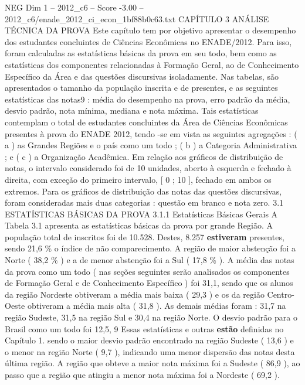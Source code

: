 \begin{textsample}{NEG Dim 1 – 2012\_c6 – Score -3.00 – 2012\_c6/enade\_2012\_ci\_econ\_1bf88b0c63.txt}  \label{ex:f1_neg_253}
CAPÍTULO 3 ANÁLISE TÉCNICA DA PROVA Este capítulo tem por objetivo apresentar o desempenho dos estudantes concluintes de Ciências Econômicas no ENADE/2012.
Para isso, foram calculadas as estatísticas básicas da prova em seu todo, bem como as estatísticas dos componentes relacionadas à Formação Geral, ao de Conhecimento Específico da Área e das questões discursivas isoladamente.
Nas tabelas, são apresentados o tamanho da população inscrita e de presentes, e as seguintes estatísticas das notas9 : média do desempenho na prova, erro padrão da média, desvio padrão, nota mínima, mediana e nota máxima.
Tais estatísticas contemplam o total de estudantes concluintes da Área de Ciências Econômicas presentes à prova do ENADE 2012, tendo -se em vista as seguintes agregações : ( a ) as Grandes Regiões e o país como um todo ; ( b ) a Categoria Administrativa ; e ( c ) a Organização Acadêmica.
Em relação aos gráficos de distribuição de notas, o intervalo considerado foi de 10 unidades, aberto à esquerda e fechado à direita, com exceção do primeiro intervalo, [ 0 ; 10 ], fechado em ambos os extremos.
Para os gráficos de distribuição das notas das questões discursivas, foram consideradas mais duas categorias : questão em branco e nota zero. 3.1 ESTATÍSTICAS BÁSICAS DA PROVA 3.1.1 Estatísticas Básicas Gerais A Tabela 3.1 apresenta as estatísticas básicas da prova por grande Região.
A população total de inscritos foi de 10.528.
Destes, 8.257 \textbf{estiveram} presentes, sendo 21,6 \% o índice de não comparecimento.
A região de maior abstenção foi a Norte ( 38,2 \% ) e a de menor abstenção foi a Sul ( 17,8 \% ).
A média das notas da prova como um todo ( nas seções seguintes serão analisados os componentes de Formação Geral e de Conhecimento Específico ) foi 31,1, sendo que os alunos da região Nordeste obtiveram a média mais baixa ( 29,3 ) e os da região Centro-Oeste obtiveram a média mais alta ( 31,8 ).
As demais médias foram : 31,7 na região Sudeste, 31,5 na região Sul e 30,4 na região Norte.
O desvio padrão para o Brasil como um todo foi 12,5, 9 Essas estatísticas e outras \textbf{estão} definidas no Capítulo 1. sendo o maior desvio padrão encontrado na região Sudeste ( 13,6 ) e o menor na região Norte ( 9,7 ), indicando uma menor dispersão das notas desta última região.
A região que obteve a maior nota máxima foi a Sudeste ( 86,9 ), ao passo que a região que atingiu a menor nota máxima foi a Nordeste ( 69,2 ).

\end{textsample}
